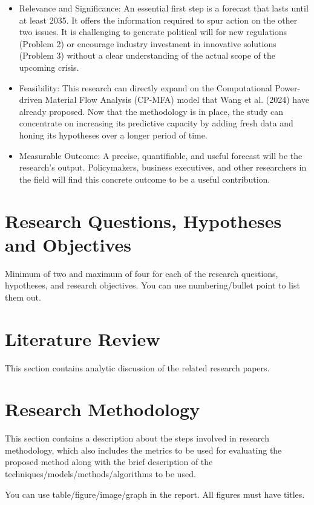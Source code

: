 \documentclass[a4paper, 12pt]{article}
\begin{document}
\begin{itemize}
	\item Relevance and Significance: An essential first step is a forecast that lasts until at least 2035. It offers the information required to spur action on the other two issues. It is challenging to generate political will for new regulations (Problem 2) or encourage industry investment in innovative solutions (Problem 3) without a clear understanding of the actual scope of the upcoming crisis.
	
	\item Feasibility: This research can directly expand on the Computational Power-driven Material Flow Analysis (CP-MFA) model that Wang et al. (2024) have already proposed. Now that the methodology is in place, the study can concentrate on increasing its predictive capacity by adding fresh data and honing its hypotheses over a longer period of time.
	
	\item Measurable Outcome: A precise, quantifiable, and useful forecast will be the research's output.  Policymakers, business executives, and other researchers in the field will find this concrete outcome to be a useful contribution.
\end{itemize}

\section{Research Questions, Hypotheses and Objectives}
Minimum of two and maximum of four for each of the research questions, hypotheses, and research objectives. You can use numbering/bullet point to list them out.

\section{Literature Review}
This section contains analytic discussion of the related research papers. 

\section{Research Methodology}
This section contains a description about the steps involved in research methodology, which also includes the metrics to be used for evaluating the proposed method along with the brief description of the techniques/models/methods/algorithms to be used.

You can use table/figure/image/graph in the report. All figures must have titles.
\end{document}
